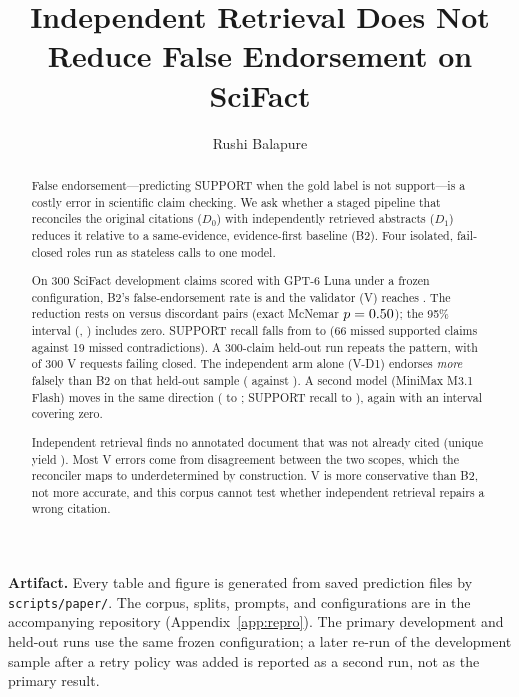 \documentclass[11pt,a4paper]{article}
\title{\textbf{Independent Retrieval Does Not Reduce False Endorsement on SciFact}}
\author{Rushi Balapure}
\date{}
\newcommand{\Dzero}{\ensuremath{D_0}}
\newcommand{\Done}{\ensuremath{D_1}}
\begin{document}
\maketitle

\begin{abstract}
False endorsement---predicting SUPPORT when the gold label is not
support---is a costly error in scientific claim checking. We ask whether a
staged pipeline that reconciles the original citations (\Dzero) with
independently retrieved abstracts (\Done) reduces it relative to a
same-evidence, evidence-first baseline (B2). Four isolated, fail-closed
roles run as stateless calls to one model.

On 300 SciFact development claims scored with GPT-6 Luna under a frozen
configuration, B2's false-endorsement rate is \lunadevBTwofe{} and the
validator (V) reaches \lunadevVfe{}. The reduction rests on
\lunadevdiscBTwo{} versus \lunadevdiscV{} discordant pairs (exact McNemar
$p=0.50{}$); the 95\% interval
(\lunadevfediff{}, \lunadevfeci{}) includes zero. SUPPORT recall falls from
\lunadevBTwosupportRecall{} to \lunadevVsupportRecall{} (66 missed supported
claims against 19 missed contradictions). A 300-claim held-out run repeats
the pattern, with \lunaheldVfailclosed{} of 300 V requests failing closed.
The independent arm alone (\mbox{V-D1}) endorses \emph{more} falsely than
B2 on that held-out sample (\lunaheldVDOnefe{} against \lunaheldBTwofe{}).
A second model (MiniMax M3.1 Flash) moves in the same direction
(\mmdevBTwofe{} to \mmdevVfe{}; SUPPORT recall \mmdevBTwosupportRecall{} to
\mmdevVsupportRecall{}), again with an interval covering zero.

Independent retrieval finds no annotated document that was not already
cited (unique yield \retrievalUnique{}). Most V errors come from
disagreement between the two scopes, which the reconciler maps to
underdetermined by construction. V is more conservative than B2, not more
accurate, and this corpus cannot test whether independent retrieval
repairs a wrong citation.
\end{abstract}

\noindent\textbf{Artifact.} Every table and figure is generated from saved
prediction files by \texttt{scripts/paper/}. The corpus, splits, prompts,
and configurations are in the accompanying repository
(Appendix~\ref{app:repro}). The primary development and held-out runs use
the same frozen configuration; a later re-run of the development sample
after a retry policy was added is reported as a second run, not as the
primary result.
\end{document}

